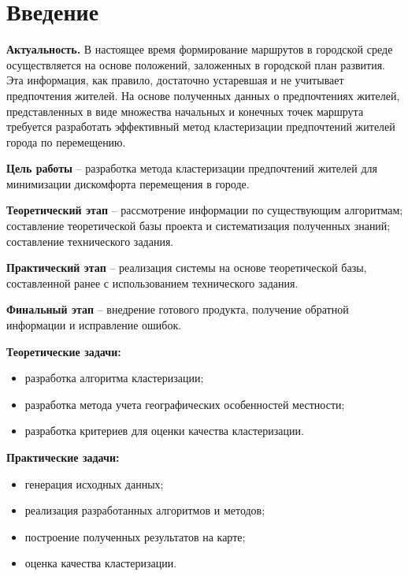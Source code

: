 \chapter{Введение}

\textbf{Актуальность.} В настоящее время формирование маршрутов в городской среде осуществляется
на основе положений, заложенных в городской план развития. Эта информация, как правило, достаточно
устаревшая и не учитывает предпочтения жителей. На основе полученных данных о предпочтениях
жителей, представленных в виде множества начальных и конечных точек маршрута требуется разработать
эффективный метод кластеризации предпочтений жителей города по перемещению.

\textbf{Цель работы} -- разработка метода кластеризации предпочтений жителей для минимизации
дискомфорта перемещения в городе.

\textbf{Теоретический этап} -- рассмотрение информации по существующим алгоритмам;
составление теоретической базы проекта и систематизация полученных знаний;
составление технического задания.

\textbf{Практический этап} -- реализация системы на основе теоретической базы, составленной ранее с
использованием технического задания.

\textbf{Финальный этап} -- внедрение готового продукта, получение обратной информации и исправление
ошибок.

\textbf{Теоретические задачи:}
\vspace*{-1em}
\begin{itemize}\itemsep-5pt
    \item разработка алгоритма кластеризации;
    \item разработка метода учета географических особенностей местности;
    \item разработка критериев для оценки качества кластеризации.
\end{itemize}
\textbf{Практические задачи:}
\vspace*{-1em}
\begin{itemize}\itemsep-5pt
    \item генерация исходных данных;
    \item реализация разработанных алгоритмов и методов;
    \item построение полученных результатов на карте;
    \item оценка качества кластеризации.
\end{itemize}

\newpage

